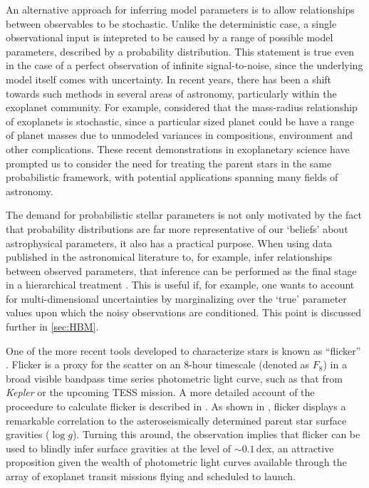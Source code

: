\documentclass[apjl]{emulateapj}
\newcommand{\logg}{$\log g$}
\begin{document}
An alternative approach for inferring model parameters is to allow
relationships between observables to be stochastic.
Unlike the deterministic case, a single observational input is intepreted to
be caused by a range of possible model parameters, described by a probability
distribution.
This statement is true even in the case of a perfect observation of infinite
signal-to-noise, since the underlying model itself comes with uncertainty.
In recent years, there has been a shift towards such methods in several areas
of astronomy, particularly within the exoplanet community.
For example, \citet{wolfgang:2015} considered that the mass-radius
relationship of exoplanets is stochastic, since a particular sized planet
could be have a range of planet masses due to unmodeled variances in
compositions, environment and other complications.
These recent demonstrations in exoplanetary science have prompted us to
consider the need for treating the parent stars in the same probabilistic
framework, with potential applications spanning many fields of astronomy.

The demand for probabilistic stellar parameters is not only motivated by the fact
that probability distributions are far more representative of our `beliefs'
about astrophysical parameters, it also has a practical purpose.
When using data published in the astronomical literature to, for example, infer
relationships between observed parameters, that inference can be performed as
the final stage in a hierarchical treatment
\citep[see, e.g.][]{foreman-mackey:2014}.
This is useful if, for example, one wants to account for multi-dimensional
uncertainties by marginalizing over the `true' parameter values upon which the
noisy observations are conditioned.
This point is discussed further in \textsection\ref{sec:HBM}.



One of the more recent tools developed to characterize stars is known as
``flicker'' \citep{bastien:2013}.
Flicker is a proxy for the scatter on an 8-hour timescale (denoted as $F_8$)
in a broad visible bandpass time series photometric light curve, such as that
from \textit{Kepler} or the upcoming TESS mission. A more detailed account of
the proceedure to calculate flicker is described in \citet{bastien:2013}. As
shown in \citet{bastien:2013}, flicker displays a remarkable correlation to
the asteroseismically determined parent star surface gravities (\logg).
Turning this around, the observation implies that flicker can be used to
blindly infer surface gravities at the level of $\sim0.1$\,dex, an attractive
proposition given the wealth of photometric light curves available through the
array of exoplanet transit missions flying and scheduled to launch.
\end{document}
